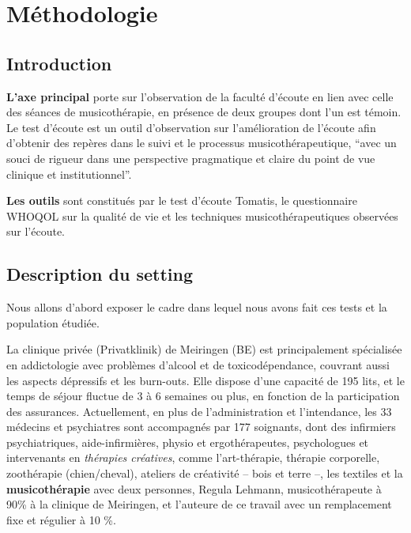 \chapter{Méthodologie} 

\section{Introduction}
 
\textbf{L'axe principal} porte sur l'observation de la faculté d'écoute en lien avec celle des séances 
de musicothérapie, en présence de deux groupes dont l'un est témoin. %
Le test d'écoute est  un outil d'observation sur l'amélioration de l'écoute afin 
d'obtenir des repères 
dans le suivi et le processus musicothérapeutique, \enquote {avec un souci de rigueur dans une 
	perspective pragmatique et claire du point de vue clinique et institutionnel}\autocite[p. 
36]{vrait_musicotherapie_2018}. 

\textbf{Les outils} sont constitués par  le test d'écoute Tomatis, le questionnaire WHOQOL sur la 
qualité de vie et les techniques  musicothérapeutiques observées sur l'écoute.


 
 
 \section{Description du setting}
 Nous allons
 d'abord exposer le cadre dans lequel nous avons fait ces tests et la
 population étudiée.
 
 La clinique privée (Privatklinik)
 de Meiringen (BE) est  principalement spécialisée en
 addictologie avec problèmes d'alcool et de toxicodépendance, couvrant aussi les aspects dépressifs
 et les
 burn-outs.
 Elle dispose d'une capacité de 195 lits, et le temps de séjour fluctue de 3 à 6 semaines ou plus, en
 fonction de la participation des assurances.
Actuellement, en plus de l'administration et l'intendance, les 33
 médecins et psychiatres sont
 accompagnés par 177
 soignants, dont des infirmiers psychiatriques, aide-infirmières, physio et
 ergothérapeutes,
 psychologues et intervenants en \textit{thérapies
 créatives}, comme l'art-thérapie, thérapie
 corporelle, zoothérapie (chien/cheval),  ateliers de créativité --
 bois et terre --,  les textiles et la\textbf{ musicothérapie} avec deux
 personnes, Regula Lehmann, musicothérapeute  à 90\%  à la clinique de Meiringen, et  l'auteure de ce 
 travail avec un remplacement fixe et régulier à 10 \%.

